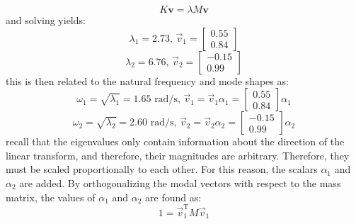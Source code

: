 \documentclass[12pt,letter]{article}
\begin{document}
\begin{example}
	\begin{equation}
	K \textbf{v} = \lambda M \textbf{v}
	\end{equation}
	and solving yields:
	\begin{equation}
	\lambda_1 = 2.73 \text{, } \vec{v}_1 = \begin{bmatrix} 0.55 \\  0.84 \end{bmatrix} 
	\end{equation}
	\begin{equation}
	\lambda_2 = 6.76 \text{, } \vec{v}_2 = \begin{bmatrix} -0.15 \\  0.99 \end{bmatrix}  \nonumber
	\end{equation}
	this is then related to the natural frequency and mode shapes as:
	\begin{equation}
	\omega_1 = \sqrt{\lambda_1} = 1.65 \text{ rad/s, } \vec{v}_1 = \vec{v}_1 \alpha_1 = \begin{bmatrix} 0.55 \\  0.84 \end{bmatrix} \alpha_1
	\end{equation}
	\begin{equation}
	\omega_2 = \sqrt{\lambda_2} = 2.60 \text{ rad/s, } \vec{v}_2 = \vec{v}_2 \alpha_2 = \begin{bmatrix} -0.15 \\  0.99 \end{bmatrix} \alpha_2 
	\end{equation}
	recall that the eigenvalues only contain information about the direction of the linear transform, and therefore, their magnitudes are arbitrary. Therefore, they must be scaled proportionally to each other. For this reason, the scalars $\alpha_1$ and $\alpha_2$ are added. By orthogonalizing the modal vectors with respect to the mass matrix, the values of $\alpha_1$ and $\alpha_2$ are found as:
	\begin{equation}
	1 = \vec{v}_1^\text{T} M \vec{v}_1 
	\end{equation}

\end{example}
\end{document}
